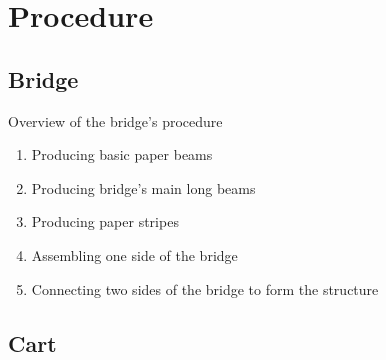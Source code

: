 \section{Procedure}
\subsection{Bridge}
Overview of the bridge’s procedure
\begin{enumerate}
\item Producing basic paper beams 
\item Producing bridge’s main long beams
\item Producing paper stripes
\item Assembling one side of the bridge
\item Connecting two sides of the bridge to form the structure
\end{enumerate}






\subsection{Cart}